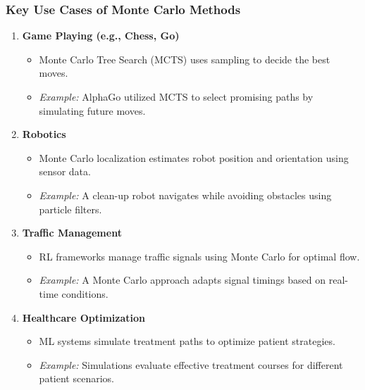 \documentclass[aspectratio=169]{beamer}
\begin{document}
\begin{frame}[fragile]
    \frametitle{Key Use Cases of Monte Carlo Methods}
    \begin{enumerate}
        \item \textbf{Game Playing (e.g., Chess, Go)}
            \begin{itemize}
                \item Monte Carlo Tree Search (MCTS) uses sampling to decide the best moves.
                \item \textit{Example:} AlphaGo utilized MCTS to select promising paths by simulating future moves.
            \end{itemize}
        \item \textbf{Robotics}
            \begin{itemize}
                \item Monte Carlo localization estimates robot position and orientation using sensor data.
                \item \textit{Example:} A clean-up robot navigates while avoiding obstacles using particle filters.
            \end{itemize}
        \item \textbf{Traffic Management}
            \begin{itemize}
                \item RL frameworks manage traffic signals using Monte Carlo for optimal flow.
                \item \textit{Example:} A Monte Carlo approach adapts signal timings based on real-time conditions.
            \end{itemize}
        \item \textbf{Healthcare Optimization}
            \begin{itemize}
                \item ML systems simulate treatment paths to optimize patient strategies.
                \item \textit{Example:} Simulations evaluate effective treatment courses for different patient scenarios.
            \end{itemize}
    \end{enumerate}
\end{frame}
\end{document}
